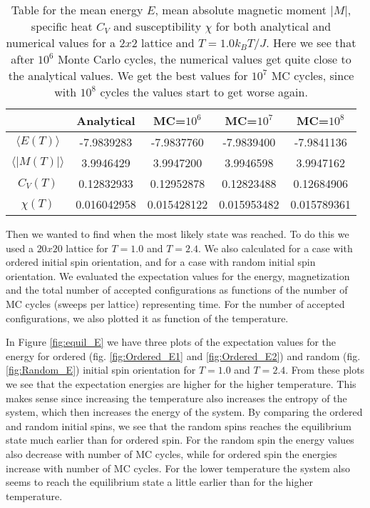 \documentclass[12pt,a4paper,english]{article}
\begin{document}
\begin{table}[htbp]
	\centering
	\begin{tabular}{ |c|c|c|c|c| }
		\hline \rule{0pt}{13pt}
		 & Analytical & MC=$10^6$ & MC=$10^7$ & MC=$10^8$\\
		\hline \rule{0pt}{13pt}
		$\langle E(T)\rangle$ & -7.9839283 & -7.9837760 & -7.9839400 & -7.9841136 \\
		\hline \rule{0pt}{13pt}
		$\langle |M(T)|\rangle$ & 3.9946429 & 3.9947200 & 3.9946598 & 3.9947162 \\
		\hline \rule{0pt}{13pt}
		$C_V(T)$ & 0.12832933 & 0.12952878 & 0.12823488 & 0.12684906 \\
		\hline \rule{0pt}{13pt}
		$\chi(T)$ & 0.016042958 & 0.015428122 & 0.015953482 & 0.015789361 \\
		\hline 
	\end{tabular}	
	\caption{Table for the mean energy $E$, mean absolute magnetic moment $|M|$, specific heat $C_V$ and susceptibility $\chi$ for both analytical and numerical values for a $2x2$ lattice and $T=1.0 k_BT/J$. Here we see that after $10^6$ Monte Carlo cycles, the numerical values get quite close to the analytical values. We get the best values for $10^7$ MC cycles, since with $10^8$ cycles the values start to get worse again.}
	\label{tab:lattice_2}
\end{table}

Then we wanted to find when the most likely state was reached. To do this we used a $20x20$ lattice for $T=1.0$ and $T=2.4$. We also calculated for a case with ordered initial spin orientation, and for a case with random initial spin orientation. We evaluated the expectation values for the energy, magnetization and the total number of accepted configurations as functions of the number of MC cycles (sweeps per lattice) representing time. For the number of accepted configurations, we also plotted it as function of the temperature. 

In Figure \ref{fig:equil_E} we have three plots of the expectation values for the energy for ordered (fig. \ref{fig:Ordered_E1} and \ref{fig:Ordered_E2}) and random (fig. \ref{fig:Random_E}) initial spin orientation for $T=1.0$ and $T=2.4$. From these plots we see that the expectation energies are higher for the higher temperature. This makes sense since increasing the temperature also increases the entropy of the system, which then increases the energy of the system. By comparing the ordered and random initial spins, we see that the random spins reaches the equilibrium state much earlier than for ordered spin. For the random spin the energy values also decrease with number of MC cycles, while for ordered spin the energies increase with number of MC cycles. For the lower temperature the system also seems to reach the equilibrium state a little earlier than for the higher temperature.
\end{document}
